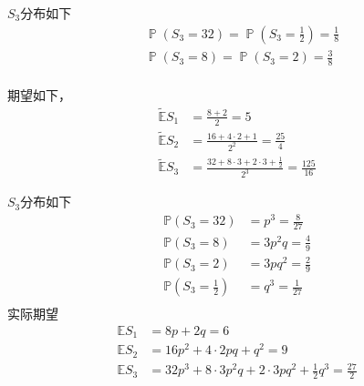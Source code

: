 \documentclass[cn]{homework}
\DeclareMathOperator{\prob}{\mathbb P}
\begin{document}
    \problem
    \begin{subproblem}
        \item
        $S_3$分布如下
        \[\begin{aligned}
            &\prob(S_3=32)
            =\prob\left(S_3=\frac{1}{2}\right)
            =\frac{1}{8}\\
            &\prob(S_3=8)
            =\prob(S_3=2)
            =\frac{3}{8}\\
        \end{aligned}\]

        \item
        \newcommand{\E}{\tilde{\mathbb E}}
        期望如下，
        \[\begin{aligned}
            \E S_1&=\frac{8+2}{2}=5\\
            \E S_2&=\frac{16+4\cdot 2+1}{2^2}=\frac{25}{4}\\
            \E S_3&=\frac{32+8\cdot 3+2\cdot 3+\frac{1}{2}}{2^3}
            =\frac{125}{16}
        \end{aligned}\]

        \item
        \newcommand{\preal}{\mathbb P}
        $S_3$分布如下
        \[\begin{aligned}
            \preal(S_3=32)&=p^3=\frac{8}{27}\\
            \preal(S_3=8)&=3p^2q=\frac{4}{9}\\
            \preal(S_3=2)&=3pq^2=\frac{2}{9}\\
            \preal\left(S_3=\frac{1}{2}\right)&=q^3=\frac{1}{27}\\
        \end{aligned}\]
        实际期望
        \renewcommand{\E}{\mathbb E}
        \[\begin{aligned}
            \E S_1&=8p+2q=6\\
            \E S_2&=16p^2+4\cdot 2pq+q^2=9\\
            \E S_3&=32p^3+8\cdot 3p^2q+2\cdot 3pq^2+\frac{1}{2}q^3
            =\frac{27}{2}
        \end{aligned}\]
    \end{subproblem}
\end{document}
